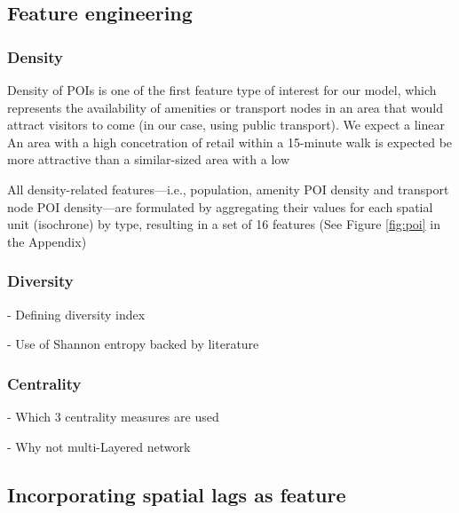\subsection{Feature engineering}
\subsubsection*{Density}

Density of POIs is one of the first feature type of interest for our model, which represents the availability of amenities or transport nodes in an area that would attract visitors to come (in our case, using public transport). We expect a linear An area with a high concetration of retail within a 15-minute walk is expected be more attractive than a similar-sized area with a low 

All density-related features---i.e., population, amenity POI density and transport node POI density---are formulated by aggregating their values for each spatial unit (isochrone) by type, resulting in a set of 16 features (See Figure \ref{fig:poi} in the Appendix)

\subsubsection*{Diversity}
- Defining diversity index

- Use of Shannon entropy backed by literature




\subsubsection*{Centrality}
- Which 3 centrality measures are used




- Why not multi-Layered network


\subsection{Incorporating spatial lags as feature}

